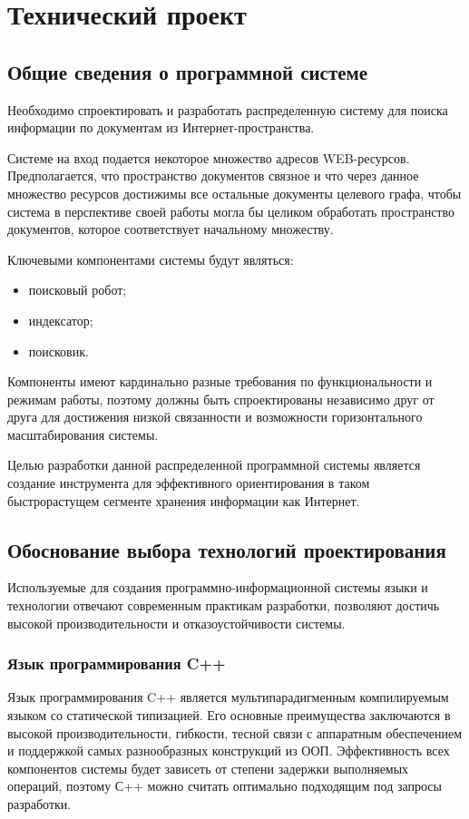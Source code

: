 \section{Технический проект}

\subsection{Общие сведения о программной системе}
Необходимо спроектировать и разработать распределенную систему для поиска информации по документам из Интернет-пространства.

Системе на вход подается некоторое множество адресов WEB-ресурсов.
Предполагается, что пространство документов связное и что через данное множество ресурсов достижимы все остальные документы целевого графа, чтобы система в перспективе своей работы могла бы целиком обработать пространство документов, которое соответствует начальному множеству.

Ключевыми компонентами системы будут являться:
\begin{itemize}
\item поисковый робот;
\item индексатор;
\item поисковик.
\end{itemize}

Компоненты имеют кардинально разные требования по функциональности и режимам работы, поэтому должны быть спроектированы независимо друг от друга для достижения низкой связанности и возможности горизонтального масштабирования системы.

Целью разработки данной распределенной программной системы является создание инструмента для эффективного ориентирования в таком быстрорастущем сегменте хранения информации как Интернет.

\subsection{Обоснование выбора технологий проектирования}
Используемые для создания программно-информационной системы
языки и технологии отвечают современным практикам разработки, позволяют достичь высокой производительности и отказоустойчивости системы.

\subsubsection{Язык программирования C++}

Язык программирования C++ является мультипарадигменным компилируемым языком со статической типизацией. Его основные преимущества заключаются в высокой производительности, гибкости, тесной связи с аппаратным обеспечением и поддержкой самых разнообразных конструкций из ООП. Эффективность всех компонентов системы будет зависеть от степени задержки выполняемых операций, поэтому С++ можно считать оптимально подходящим под запросы разработки.

